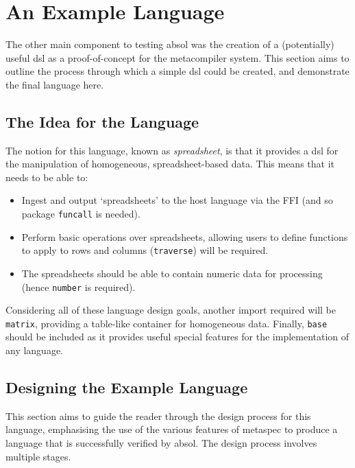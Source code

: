 \section{An Example Language} %
\label{sec:an_example_language}
The other main component to testing \gls{absol} was the creation of a (potentially) useful \gls{dsl} as a proof-of-concept for the metacompiler system. 
This section aims to outline the process through which a simple \gls{dsl} could be created, and demonstrate the final language here. 

\subsection{The Idea for the Language} %
\label{sub:the_idea_for_the_language}
The notion for this language, known as \textit{spreadsheet}, is that it provides a \gls{dsl} for the manipulation of homogeneous, spreadsheet-based data. 
This means that it needs to be able to:
\begin{itemize}
    \item Ingest and output `spreadsheets' to the host language via the FFI (and so package \texttt{funcall} is needed).
    \item Perform basic operations over spreadsheets, allowing users to define functions to apply to rows and columns (\texttt{traverse}) will be required. 
    \item The spreadsheets should be able to contain numeric data for processing (hence \texttt{number} is required). 
\end{itemize}

Considering all of these language design goals, another import required will be \texttt{matrix}, providing a table-like container for homogeneous data. 
Finally, \texttt{base} should be included as it provides useful special features for the implementation of any language. 


\subsection{Designing the Example Language} %
\label{sub:designing_the_example_language}
This section aims to guide the reader through the design process for this language, emphasising the use of the various features of \gls{metaspec} to produce a language that is successfully verified by \gls{absol}. 
The design process involves multiple stages. 

